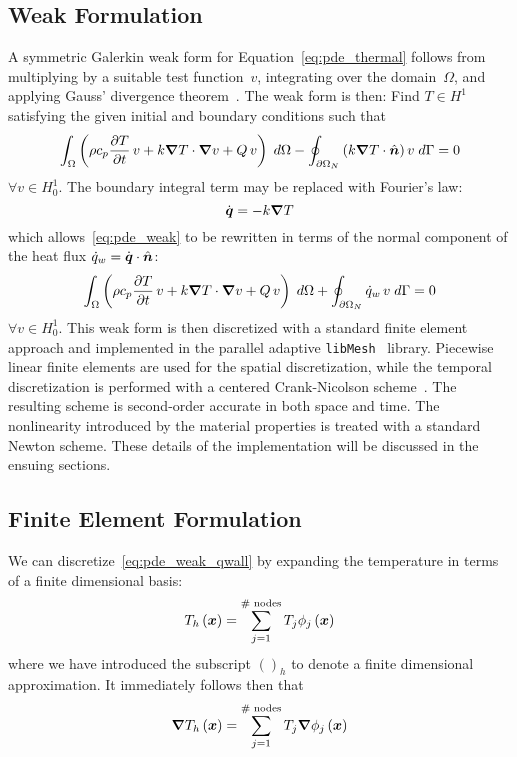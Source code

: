 \subsection{Weak Formulation}
A symmetric Galerkin weak form for Equation~\eqref{eq:pde_thermal} follows from multiplying by a suitable test function~$v$, integrating over the domain~$\Omega$, and applying Gauss' divergence theorem~\cite{becker_carey_oden_volume_1}.  The weak form is then: Find $T \in H^1$ satisfying the given initial and boundary conditions such that
\begin{equation}
  \int_\Omega \left(\rho c_p {\frac{\partial{T}}{\partial{t}}}\,v +k {\boldsymbol{\nabla}} {T}\cdot{\boldsymbol{\nabla}} {v} + Q\,v\right)\; d\Omega  - \oint_{\partial\Omega_N} \left(k{\boldsymbol{\nabla}} {T}\cdot \hat{{\boldsymbol{n}}} \right)v\; d\Gamma = 0
  \label{eq:pde_weak}
\end{equation}
$\forall v \in H_0^1$. The boundary integral term may be replaced with Fourier's law:
\begin{equation}
\dot{{\boldsymbol{q}}} = -k {\boldsymbol{\nabla}} {T}
\end{equation}
which allows~\eqref{eq:pde_weak} to be rewritten in terms of the normal component of the heat flux $\dot{q}_w = \dot{{\boldsymbol{q}}}\cdot \hat{{\boldsymbol{n}}}$:
\begin{equation}
  \int_\Omega \left(\rho c_p {\frac{\partial{T}}{\partial{t}}}\,v +k {\boldsymbol{\nabla}} {T}\cdot{\boldsymbol{\nabla}} {v} + Q\,v\right)\; d\Omega  + \oint_{\partial\Omega_N} \dot{q}_w\,v\; d\Gamma = 0
  \label{eq:pde_weak_qwall}
\end{equation}
$\forall v \in H_0^1$. This weak form is then discretized with a standard finite element approach and implemented in the parallel adaptive \texttt{libMesh}~\cite{libMeshPaper} library.  Piecewise linear finite elements are used for the spatial discretization, while the temporal discretization is performed with a centered Crank-Nicolson scheme~\cite{crank_nicolson}.  The resulting scheme is second-order accurate in both space and time.  The  nonlinearity introduced by the material properties is treated with a standard Newton scheme. These details of the implementation will be discussed in the ensuing sections.


\subsection{Finite Element Formulation}
We can discretize~\eqref{eq:pde_weak_qwall} by expanding the temperature in terms of a finite dimensional basis:
\begin{equation}
  T_h\left({\boldsymbol{x}}\right) = \sum_{j=1}^{\text{\# nodes}} T_j \phi_j\left({\boldsymbol{x}}\right)
\end{equation}
where we have introduced the subscript $()_h$ to denote a finite dimensional approximation. It immediately follows then that
\begin{equation}
  {\boldsymbol{\nabla}} {T}_h\left({\boldsymbol{x}}\right) = \sum_{j=1}^{\text{\# nodes}} T_j {\boldsymbol{\nabla}} {\phi}_j\left({\boldsymbol{x}}\right)
\end{equation}

